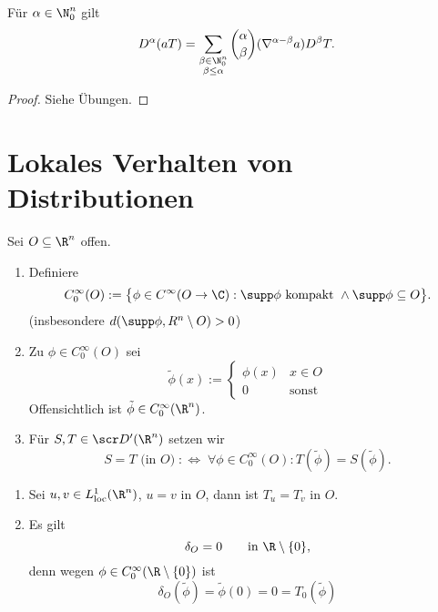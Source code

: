 \begin{st} \label{5.19}
	Für $\alpha \in \N_0^n$ gilt
	\[
		D^\alpha (a T) = \sum_{\substack{\beta \in \N_0^n \\ \beta \le \alpha}} \binom{\alpha}{\beta} (\nabla^{\alpha-\beta} a) D^\beta T.
	\]
	\begin{proof}
		Siehe Übungen.
	\end{proof}
\end{st}


\section{Lokales Verhalten von Distributionen}

\begin{df} \label{5.20}
	Sei $O \subset \R^n$ offen.
	\begin{enumerate}[1)]
		\item
			Definiere
			\[
				C_0^\infty(O) := \big\{ \phi \in C^\infty(O \to \C) : \supp \phi \text{ kompakt } \land \supp \phi \subset O \big\}.
			\]
			(insbesondere $d(\supp \phi, R^n \setminus O) > 0$)
		\item
			Zu $\phi \in C_0^\infty (O)$ sei 
			\[
				\tilde \phi(x) := \begin{cases}
					\phi(x) & x \in O \\
					0 & \text{sonst}
				\end{cases}
			\]
			Offensichtlich ist $\tilde \phi \in C_0^\infty (\R^n)$.
		\item
			Für $S,T \in \scr D'(\R^n)$ setzen wir
			\[
				S = T \text{ (in $O$)} \; :\iff \;
				\forall \phi \in  C_0^\infty (O) : T(\tilde \phi) = S(\tilde \phi).
			\]
	\end{enumerate}
\end{df}

\begin{ex} \label{5.21}
	\begin{enumerate}[1)]
		\item
			Sei $u,v \in L_{\text{loc}}^1(\R^n)$, $u =v $ in $O$, dann ist $T_u = T_v$ in $O$.
		\item
			Es gilt
			\[
				\delta_O = 0
				\qquad \text{in $\R \setminus \{0\}$},
			\]
			denn wegen $\phi \in C_0^\infty (\R \setminus \{0\})$ ist 
			\[
				\delta_O(\tilde \phi) = \tilde \phi(0) = 0 = T_0(\tilde \phi)
			\]
	\end{enumerate}
\end{ex}

